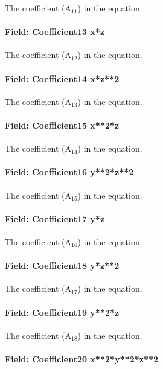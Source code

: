 The coefficient (A\(_{11}\)) in the equation.

\paragraph{Field: Coefficient13 x*z}\label{field-coefficient13-xz}

The coefficient (A\(_{12}\)) in the equation.

\paragraph{Field: Coefficient14 x*z**2}\label{field-coefficient14-xz2}

The coefficient (A\(_{13}\)) in the equation.

\paragraph{Field: Coefficient15 x**2*z}\label{field-coefficient15-x2z}

The coefficient (A\(_{14}\)) in the equation.

\paragraph{Field: Coefficient16 y**2*z**2}\label{field-coefficient16-y2z2}

The coefficient (A\(_{15}\)) in the equation.

\paragraph{Field: Coefficient17 y*z}\label{field-coefficient17-yz}

The coefficient (A\(_{16}\)) in the equation.

\paragraph{Field: Coefficient18 y*z**2}\label{field-coefficient18-yz2}

The coefficient (A\(_{17}\)) in the equation.

\paragraph{Field: Coefficient19 y**2*z}\label{field-coefficient19-y2z}

The coefficient (A\(_{18}\)) in the equation.

\paragraph{Field: Coefficient20 x**2*y**2*z**2}\label{field-coefficient20-x2y2z2}

